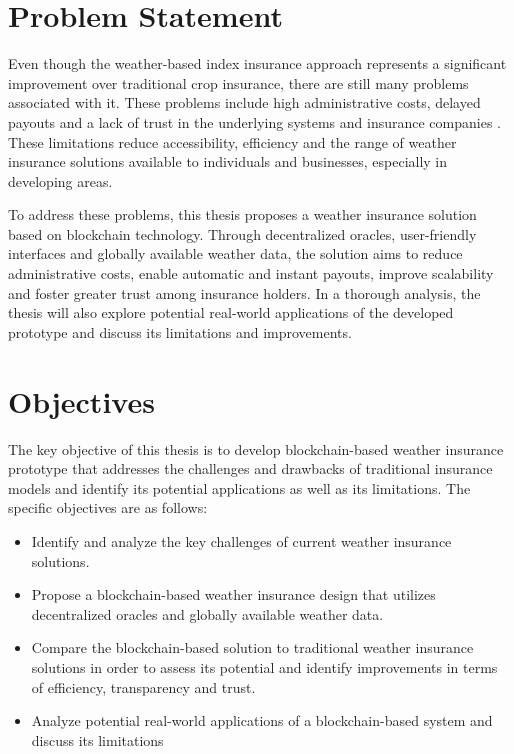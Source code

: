 \section{Problem Statement}\label{section:problem_statement}
Even though the weather-based index insurance approach represents a significant improvement over traditional crop insurance, there are still many problems associated with it. These problems include high administrative costs, delayed payouts and a lack of trust in the underlying systems and insurance companies \autocite{skees2008challenges}. These limitations reduce accessibility, efficiency and the range of weather insurance solutions available to individuals and businesses, especially in developing areas.

To address these problems, this thesis proposes a weather insurance solution based on blockchain technology. Through decentralized oracles, user-friendly interfaces and globally available weather data, the solution aims to reduce administrative costs, enable automatic and instant payouts, improve scalability and foster greater trust among insurance holders. In a thorough analysis, the thesis will also explore potential real-world applications of the developed prototype and discuss its limitations and improvements.

\section{Objectives}\label{section:objectives}
The key objective of this thesis is to develop blockchain-based weather insurance prototype that addresses the challenges and drawbacks of traditional insurance models and identify its potential applications as well as its limitations. The specific objectives are as follows:

\begin{itemize}
    \item Identify and analyze the key challenges of current weather insurance solutions.
    \item Propose a blockchain-based weather insurance design that utilizes decentralized oracles and globally available weather data.
    \item Compare the blockchain-based solution to traditional weather insurance solutions in order to assess its potential and identify improvements in terms of efficiency, transparency and trust.
    \item Analyze potential real-world applications of a blockchain-based system and discuss its limitations
\end{itemize}